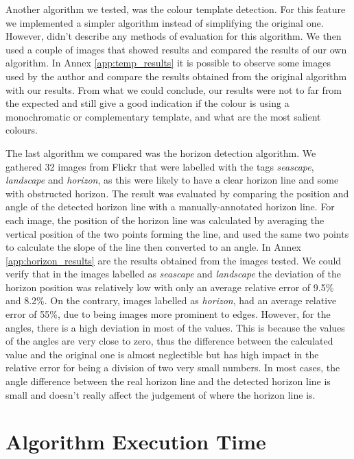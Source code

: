 Another algorithm we tested, was the colour template detection. For this feature we implemented a simpler algorithm instead of simplifying the original one. However, \citeauthor{cohen2006color} \cite{cohen2006color} didn't describe any methods of evaluation for this algorithm. We then used a couple of images that showed results and compared the results of our own algorithm. In Annex \ref{app:temp_results} it is possible to observe some images used by the author and compare the results obtained from the original algorithm with our results. From what we could conclude, our results were not to far from the expected and still give a good indication if the colour is using a monochromatic or complementary template, and what are the most salient colours.


The last algorithm we compared was the horizon detection algorithm. We gathered 32 images from Flickr that were labelled with the tags \emph{seascape}, \emph{landscape} and \emph{horizon}, as this were likely to have a clear horizon line and some with obstructed horizon. The result was evaluated by comparing the position and angle of the detected horizon line with a manually-annotated horizon line. For each image, the position of the horizon line was calculated by averaging the vertical position of the two points forming the line, and used the same two points to calculate the slope of the line then converted to an angle. In Annex \ref{app:horizon_results} are the results obtained from the images tested. We could verify that in the images labelled as \emph{seascape} and \emph{landscape} the deviation of the horizon position was relatively low with only an average relative error of 9.5\% and 8.2\%. On the contrary, images labelled as \emph{horizon}, had an average relative error of 55\%, due to being images more prominent to edges. However, for the angles, there is a high deviation in most of the values. This is because the values of the angles are very close to zero, thus the difference between the calculated value and the original one is almost neglectible but has high impact in the relative error for being a division of two very small numbers. In most cases, the angle difference between the real horizon line and the detected horizon line is small and doesn't really affect the judgement of where the horizon line is.

\section{Algorithm Execution Time}

